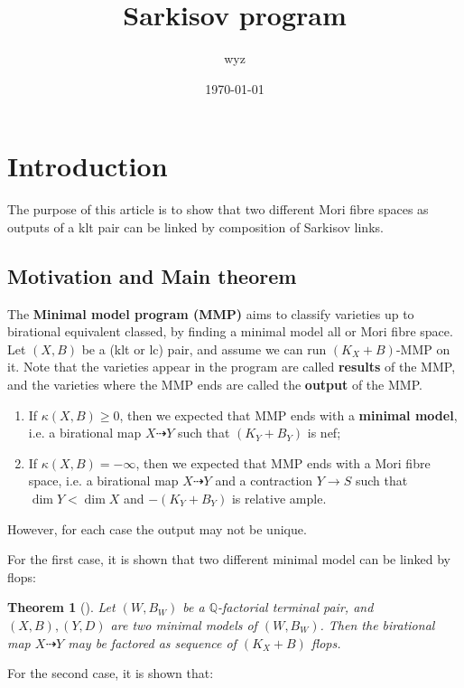 \documentclass{article}
\title{Sarkisov program}
\author{wyz}
\date{\today}
\newtheorem{thm}[defn]{Theorem}
\begin{document}
  \maketitle
  \tableofcontents
\section{Introduction}

The purpose of this article is to show that two different Mori fibre spaces as outputs of a klt pair can be linked by composition of  Sarkisov links.



\subsection{Motivation and Main theorem}
The \textbf{Minimal model program (MMP)}  aims to classify varieties up to birational equivalent classed, by finding a minimal model all or Mori fibre space. Let $ \left(X,B\right) $ be a (klt or lc) pair, and assume we can run $ (K_X+B)$-MMP on it. Note that the varieties appear in the program are called \textbf{results} of the MMP, and the varieties where the MMP ends are called the \textbf{output} of the MMP.
\begin{enumerate}
  \item If $\kappa(X,B)\geqslant 0$, then we expected that MMP ends with a \textbf{minimal model}, i.e. a birational map $X \dashrightarrow Y$ such that $(K_Y+B_Y)$ is nef;
  \item If $\kappa(X,B)= -\infty$, then we expected that MMP ends with a Mori fibre space, i.e. a birational map $X \dashrightarrow Y$ and a contraction $Y\to S$ such that $\dim Y<\dim X$ and $-(K_Y+B_Y)$ is relative ample.
\end{enumerate}
However, for each case the output may not be unique.

For the first case, it is shown that two different minimal model can be linked by flops:
\begin{thm}[\cite{kawamataFlopsConnectMinimal2008}]
  Let $(W,B_W)$ be a $\mathbb{Q}$-factorial terminal pair, and $(X,B),(Y,D)$ are two minimal models of $(W,B_W)$. Then the birational map $X\dashrightarrow Y$ may be factored as sequence of $(K_X+B)$ flops. 
\end{thm}
For the second case, it is shown that:
\end{document}
